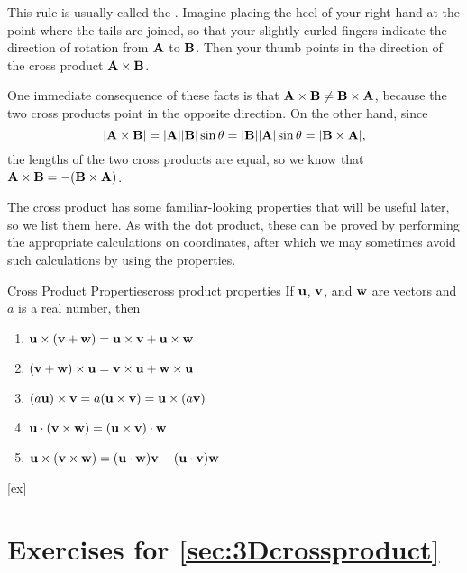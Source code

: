 This rule is usually called the .
Imagine placing the heel of your right hand at the point where the tails are
joined, so that your slightly curled fingers indicate the direction of
rotation from $\bf A$ to $\bf B$. Then your thumb points in the
direction of the cross product ${\bf A}\times{\bf B}$.

One immediate consequence of these facts is that 
${\bf A}\times{\bf B}\not={\bf B}\times{\bf A}$, because the two
cross products point in the opposite direction. On the other hand,
since 
$$
  |{\bf A}\times{\bf B}|=|{\bf A}||{\bf B}|\sin\theta
  =|{\bf B}||{\bf A}|\sin\theta=|{\bf B}\times{\bf A}|,
$$
the lengths of the two cross products are equal, so
we know that ${\bf A}\times{\bf B}=-({\bf B}\times{\bf A})$.

The cross product has some familiar-looking properties that will be
useful later, so we list them here. As with the dot product, these can
be proved by performing the appropriate calculations on coordinates,
after which we may sometimes avoid such calculations by using the
properties. 

\begin{theorem}{Cross Product Properties}{cross product properties}
If ${\bf u}$, ${\bf v}$, and ${\bf w}$ are vectors and $a$ is a real
number, then
\begin{enumerate}
	\item	${\bf u}\times({\bf v}+{\bf w}) = 
	{\bf u}\times{\bf v}+{\bf u}\times{\bf w}$
	\item	$({\bf v}+{\bf w})\times{\bf u} = 
	{\bf v}\times{\bf u}+{\bf w}\times{\bf u}$
	\item	$(a{\bf u})\times{\bf v}=a({\bf u}\times{\bf v})
	={\bf u}\times(a{\bf v})$
	\item	${\bf u}\cdot({\bf v}\times{\bf w}) = 
	({\bf u}\times{\bf v})\cdot{\bf w}$
	\item	${\bf u}\times({\bf v}\times{\bf w}) =
	({\bf u}\cdot{\bf w}){\bf v}-({\bf u}\cdot{\bf v}){\bf w}$
\end{enumerate}
\end{theorem}


[ex]
\section*{Exercises for \ref{sec:3Dcrossproduct}}

